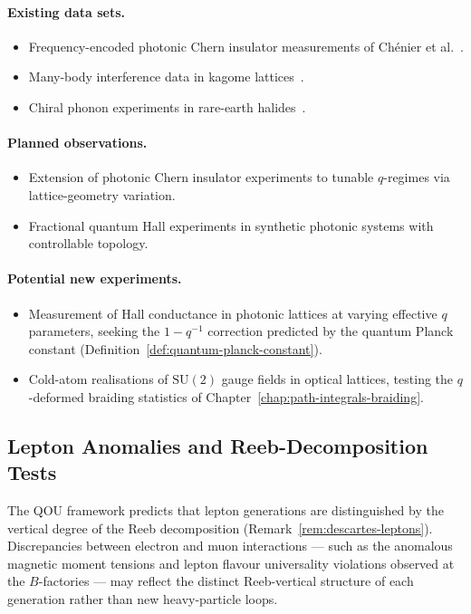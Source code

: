 \paragraph{Existing data sets.}
\begin{itemize}
  \item Frequency-encoded photonic Chern insulator measurements of
        Ch\'enier et al.~\cite{chenier2026}.
  \item Many-body interference data in kagome lattices~\cite{guo2025}.
  \item Chiral phonon experiments in rare-earth halides~\cite{luo2023}.
\end{itemize}

\paragraph{Planned observations.}
\begin{itemize}
  \item Extension of photonic Chern insulator experiments to tunable
        $q$-regimes via lattice-geometry variation.
  \item Fractional quantum Hall experiments in synthetic photonic systems
        with controllable topology.
\end{itemize}

\paragraph{Potential new experiments.}
\begin{itemize}
  \item Measurement of Hall conductance in photonic lattices at varying
        effective $q$ parameters, seeking the $1 - q^{-1}$ correction predicted
        by the quantum Planck constant
        (Definition~\ref{def:quantum-planck-constant}).
  \item Cold-atom realisations of $\mathrm{SU}(2)$ gauge fields in optical
        lattices, testing the $q$-deformed braiding statistics of
        Chapter~\ref{chap:path-integrals-braiding}.
\end{itemize}

\subsection{Lepton Anomalies and Reeb-Decomposition Tests}
\label{sec:lepton-anomalies}

\begin{remark}
\label{rem:lepton-discrepancies}
The QOU framework predicts that lepton generations are distinguished by the
vertical degree of the Reeb decomposition
(Remark~\ref{rem:descartes-leptons}).  Discrepancies between electron and muon
interactions --- such as the anomalous magnetic moment tensions and lepton
flavour universality violations observed at the $B$-factories --- may reflect
the distinct Reeb-vertical structure of each generation rather than new
heavy-particle loops.
\end{remark}


